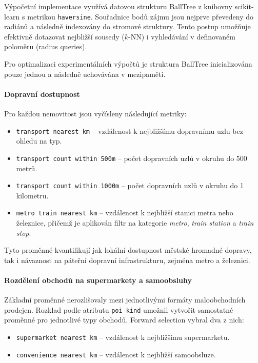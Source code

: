 Výpočetní implementace využívá datovou strukturu BallTree z knihovny scikit-learn s metrikou \texttt{haversine}. Souřadnice bodů zájmu jsou nejprve převedeny do radiánů a následně indexovány do stromové struktury. Tento postup umožňuje efektivně dotazovat nejbližší sousedy (\(k\)-NN) i vyhledávání v definovaném poloměru (radius queries).

Pro optimalizaci experimentálních výpočtů je struktura BallTree inicializována pouze jednou a následně uchovávána v mezipaměti.

\paragraph{Dopravní dostupnost}

Pro každou nemovitost jsou vyčísleny následující metriky:

\begin{itemize}
    \item \texttt{transport nearest km} -- vzdálenost k nejbližšímu dopravnímu uzlu bez ohledu na typ.
    \item \texttt{transport count within 500m} -- počet dopravních uzlů v okruhu do 500 metrů.
    \item \texttt{transport count within 1000m} -- počet dopravních uzlů v okruhu do 1 kilometru.
    \item \texttt{metro train nearest km} -- vzdálenost k nejbližší stanici metra nebo železnice, přičemž je aplikován filtr na kategorie \emph{metro}, \emph{train station} a \emph{train stop}.
\end{itemize}

Tyto proměnné kvantifikují jak lokální dostupnost městské hromadné dopravy, tak i návaznost na páteřní dopravní infrastrukturu, zejména metro a železnici.

\paragraph{Rozdělení obchodů na supermarkety a samoobsluhy}

Základní proměnné nerozlišovaly mezi jednotlivými formáty maloobchodních prodejen. Rozklad podle atributu \texttt{poi kind} umožnil vytvořit samostatné proměnné pro jednotlivé typy obchodů. Forward selection vybral dva z nich:

\begin{itemize}
    \item \texttt{supermarket nearest km} -- vzdálenost k nejbližšímu supermarketu.
    \item \texttt{convenience nearest km} -- vzdálenost k nejbližší samoobsluze.
\end{itemize}

